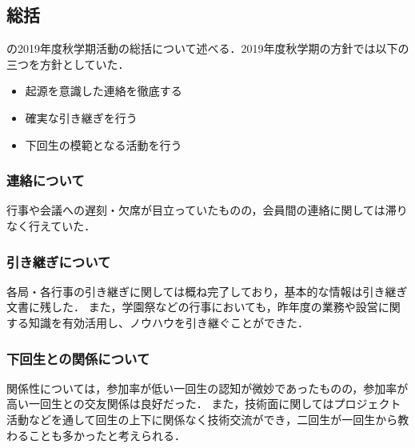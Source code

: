 \subsection*{\secondGrade{}総括}


\secondGrade{}の2019年度秋学期活動の総括について述べる．2019年度秋学期の方針では以下の三つを方針としていた．
\begin{itemize}
    \item 起源を意識した連絡を徹底する
    \item 確実な引き継ぎを行う
    \item 下回生の模範となる活動を行う

\end{itemize}

\subsubsection*{連絡について}
行事や会議への遅刻・欠席が目立っていたものの，会員間の連絡に関しては滞りなく行えていた． 
\subsubsection*{引き継ぎについて}
各局・各行事の引き継ぎに関しては概ね完了しており，基本的な情報は引き継ぎ文書に残した．
また，学園祭などの行事においても，昨年度の業務や設営に関する知識を有効活用し、ノウハウを引き継ぐことができた． 
\subsubsection*{下回生との関係について}
関係性については，参加率が低い一回生の認知が微妙であったものの，参加率が高い一回生との交友関係は良好だった．
また，技術面に関してはプロジェクト活動などを通して回生の上下に関係なく技術交流ができ，二回生が一回生から教わることも多かったと考えられる．